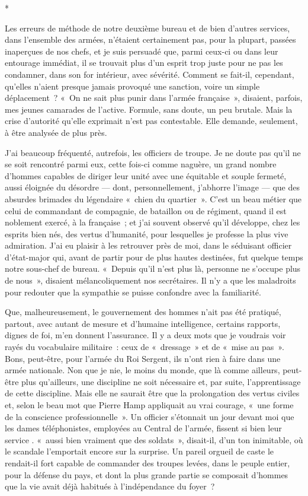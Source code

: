 \documentclass[french,twoside]{book} %
\begin{document}
\begin{center}
*\par
\end{center}

\noindent Les erreurs de méthode de notre deuxième bureau et de bien d’autres services, dans l’ensemble des armées, n’étaient certainement pas, pour la plupart, passées inaperçues de nos chefs, et je suis persuadé que, parmi ceux-ci ou dans leur entourage immédiat, il se trouvait plus d’un esprit trop juste pour ne pas les condamner, dans son for intérieur, avec sévérité. Comment se fait-il, cependant, qu’elles n’aient presque jamais provoqué une sanction, voire un simple déplacement ? « On ne sait plus punir dans l’armée française », disaient, parfois, mes jeunes camarades de l’active. Formule, sans doute, un peu brutale. Mais la crise d’autorité qu’elle exprimait n’est pas contestable. Elle demande, seulement, à être analysée de plus près.\par
J’ai beaucoup fréquenté, autrefois, les officiers de troupe. Je ne doute pas qu’il ne se soit rencontré parmi eux, cette fois-ci comme naguère, un grand nombre d’hommes capables de diriger leur unité avec une équitable et souple fermeté, aussi éloignée du désordre — dont, personnellement, j’abhorre l’image — que des absurdes brimades du légendaire « chien du quartier ». C’est un beau métier que celui de   commandant de compagnie, de bataillon ou de régiment, quand il est noblement exercé, à la française ; et j’ai souvent observé qu’il développe, chez les esprits bien nés, des vertus d’humanité, pour lesquelles je professe la plus vive admiration. J’ai eu plaisir à les retrouver près de moi, dans le séduisant officier d’état-major qui, avant de partir pour de plus hautes destinées, fut quelque temps notre sous-chef de bureau. « Depuis qu’il n’est plus là, personne ne s’occupe plus de nous », disaient mélancoliquement nos secrétaires. Il n’y a que les maladroits pour redouter que la sympathie se puisse confondre avec la familiarité.\par
Que, malheureusement, le gouvernement des hommes n’ait pas été pratiqué, partout, avec autant de mesure et d’humaine intelligence, certains rapports, dignes de foi, m’en donnent l’assurance. Il y a deux mots que je voudrais voir rayés du vocabulaire militaire : ceux de « dressage » et de « mise au pas ». Bons, peut-être, pour l’armée du Roi Sergent, ils n’ont rien à faire dans une armée nationale. Non que je nie, le moins du monde, que là comme ailleurs, peut-être plus qu’ailleurs, une discipline ne soit nécessaire et, par suite, l’apprentissage de cette discipline. Mais elle ne saurait être que la prolongation des vertus civiles et, selon le beau mot que Pierre Hamp appliquait au vrai courage, « une forme de la conscience professionnelle ». Un officier s’étonnait un jour devant moi que les dames téléphonistes, employées au Central de l’armée, fissent si bien leur service . « aussi bien vraiment que des soldats », disait-il, d’un ton inimitable, où le scandale l’emportait encore sur la surprise. Un pareil orgueil de caste le rendait-il fort capable de commander des troupes levées, dans le peuple entier, pour la défense du pays, et dont la plus grande partie se composait d’hommes que la vie avait déjà habitués à l’indépendance du foyer ?\par
\end{document}
